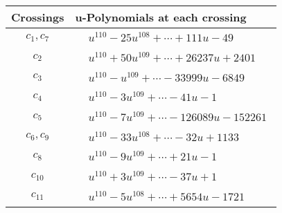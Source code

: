 \documentclass[1p]{elsarticle_modified}
\theoremstyle{definition}
\begin{document}
\begin{tabular}{m{50pt}|m{274pt}}
Crossings & \hspace{64pt}u-Polynomials at each crossing \\
\hline $$\begin{aligned}c_{1},c_{7}\end{aligned}$$&$\begin{aligned}
&u^{110}-25 u^{108}+\cdots+111 u-49
\end{aligned}$\\
\hline $$\begin{aligned}c_{2}\end{aligned}$$&$\begin{aligned}
&u^{110}+50 u^{109}+\cdots+26237 u+2401
\end{aligned}$\\
\hline $$\begin{aligned}c_{3}\end{aligned}$$&$\begin{aligned}
&u^{110}- u^{109}+\cdots-33999 u-6849
\end{aligned}$\\
\hline $$\begin{aligned}c_{4}\end{aligned}$$&$\begin{aligned}
&u^{110}-3 u^{109}+\cdots-41 u-1
\end{aligned}$\\
\hline $$\begin{aligned}c_{5}\end{aligned}$$&$\begin{aligned}
&u^{110}-7 u^{109}+\cdots-126089 u-152261
\end{aligned}$\\
\hline $$\begin{aligned}c_{6},c_{9}\end{aligned}$$&$\begin{aligned}
&u^{110}-33 u^{108}+\cdots-32 u+1133
\end{aligned}$\\
\hline $$\begin{aligned}c_{8}\end{aligned}$$&$\begin{aligned}
&u^{110}-9 u^{109}+\cdots+21 u-1
\end{aligned}$\\
\hline $$\begin{aligned}c_{10}\end{aligned}$$&$\begin{aligned}
&u^{110}+3 u^{109}+\cdots-37 u+1
\end{aligned}$\\
\hline $$\begin{aligned}c_{11}\end{aligned}$$&$\begin{aligned}
&u^{110}-5 u^{108}+\cdots+5654 u-1721
\end{aligned}$\\
\hline
\end{tabular}\\~\\
\end{document}
